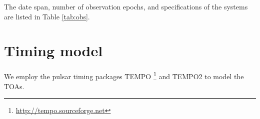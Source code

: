 

The date span, number of observation epochs, and specifications of the
systems are listed in Table \ref{tab:obs}. 



\section{Timing model}
\label{sec:model}
We employ the pulsar timing packages {\sc TEMPO}
\footnote{\url{http://tempo.sourceforge.net}} and {\sc TEMPO2} \citep{hem06} to model the TOAs. 


